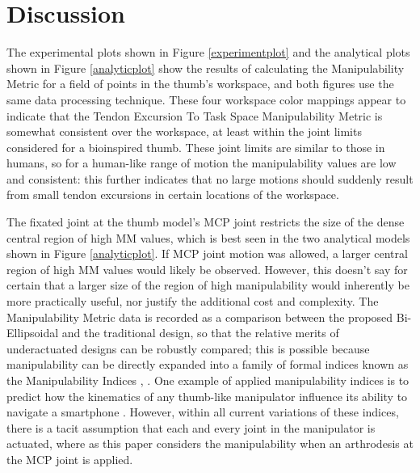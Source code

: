 \documentclass[journal]{IEEEtran}
\begin{document}
\section{Discussion}
\label{discussion}

The experimental plots shown in Figure \ref{experimentplot} and the analytical plots shown in Figure \ref{analyticplot} show the results of calculating the Manipulability Metric for a field of points in the thumb's workspace, and both figures use the same data processing technique. These four workspace color mappings appear to indicate that the Tendon Excursion To Task Space Manipulability Metric is somewhat consistent over the workspace, at least within the joint limits considered for a bioinspired thumb. These joint limits are similar to those in humans, so for a human-like range of motion the manipulability values are low and consistent: this further indicates that no large motions should suddenly result from small tendon excursions in certain locations of the workspace.

The fixated joint at the thumb model's MCP joint restricts the size of the dense central region of high MM values, which is best seen in the two analytical models shown in Figure \ref{analyticplot}. If MCP joint motion was allowed, a larger central region of high MM values would likely be observed. However, this doesn't say for certain that a larger size of the region of high manipulability would inherently be more practically useful, nor justify the additional cost and complexity. The Manipulability Metric data is recorded as a comparison between the proposed Bi-Ellipsoidal and the traditional design, so that the relative merits of underactuated designs can be robustly compared; this is possible because manipulability can be directly expanded into a family of formal indices known as the Manipulability Indices \cite{patel}, \cite{sptxt}. One example of applied manipulability indices is to predict how the kinematics of any thumb-like manipulator influence its ability to navigate a smartphone \cite{Endo}. However, within all current variations of these indices, there is a tacit assumption that each and every joint in the manipulator is actuated, where as this paper considers the manipulability when an arthrodesis at the MCP joint is applied. 
\end{document}
